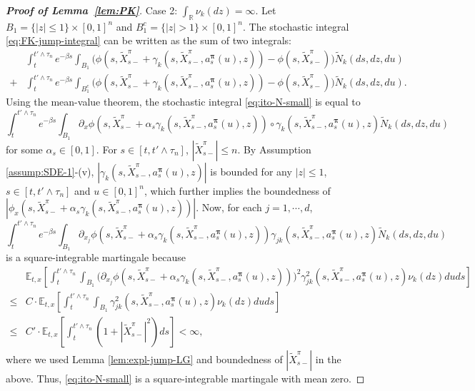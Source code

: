 \documentclass[11pt]{article}
\newcommand{\1}{\mathbbm{1}}
\newcommand{\bpi}{\boldsymbol{\pi}}
\begin{document}
\begin{proof}[\bf Proof of Lemma~\ref{lem:PK}]
	Case 2: $\int_{\mathbb{R}}\nu_k(dz)=\infty$. Let $B_{1}=\{|z|\leq 1\}\times[0,1]^n$ and $B_{1}^c=\{|z|> 1\}\times[0,1]^n$. The stochastic integral \eqref{eq:FK-jump-integral} can be written as the sum of two integrals:
	\begin{align}
	&\int_t^{t'\wedge\tau_n} e^{-\beta s}\int_{B_1} \big( \phi (s, \tilde X^{\pi}_{s-}+ \gamma_k(s, \tilde X^{\pi}_{s-}, a_s^{\bpi}(u), z)) -  \phi(s, \tilde X^{\pi}_{s-})  \big)  \widetilde{N}_k(ds, dz,du)\label{eq:ito-N-small}\\
	+&\int_t^{t'\wedge\tau_n} e^{-\beta s}\int_{B_1^c} \big( \phi(s, \tilde X^{\pi}_{s-}+ \gamma_k(s, \tilde X^{\pi}_{s-}, a_s^{\bpi}(u), z)) -  \phi(s, \tilde X^{\pi}_{s-})  \big)  \widetilde{N}_k(ds, dz, du).\label{eq:ito-N-big}
	\end{align}
	Using the mean-value theorem, the stochastic integral \eqref{eq:ito-N-small} is equal to
	\begin{equation}
		\int_t^{t'\wedge\tau_n} e^{-\beta s} \int_{B_1} \partial_x\phi(s, \tilde X^{\pi}_{s-}+\alpha_s\gamma_k(s, \tilde X^{\pi}_{s-}, a_s^{\bpi}(u),z))\circ\gamma_k(s, \tilde X^{\pi}_{s-}, a_s^{\bpi}(u),z)\widetilde{N}_k(ds, dz, du)
	\end{equation}
	for some $\alpha_s\in[0,1]$. For $s\in [t,t'\wedge\tau_n]$, $|\tilde X^{\pi}_{s-}|\leq n$. By Assumption \ref{assump:SDE-1}-(v),  $|\gamma_k(s, \tilde X^{\pi}_{s-} ,a_s^{\bpi}(u),z)|$ is bounded for any $|z|\leq 1$, $s\in [t,t'\wedge\tau_n]$ and $u\in[0,1]^n$, which further implies the boundedness of $|\phi_x(s, \tilde X^{\pi}_{s-}+\alpha_s\gamma_k(s, \tilde X^{\pi}_{s-}, a_s^{\bpi}(u), z))|$. Now, for each $j=1,\cdots,d$,
	\begin{equation}
		\int_t^{t'\wedge\tau_n} e^{-\beta s}\int_{B_1} \partial_{x_j}\phi(s, \tilde X^{\pi}_{s-}+\alpha_s\gamma_k(s, \tilde X^{\pi}_{s-}, a_s^{\bpi}(u), z))\gamma_{jk}(s, \tilde X^{\pi}_{s-}, a_s^{\bpi}(u), z)\widetilde{N}_k(ds, dz, du)
	\end{equation}
	is a square-integrable martingale because
	\begin{align}
		&\mathbb{E}_{t,x}\left[\int_t^{t'\wedge\tau_n}\int_{B_1} \big(\partial_{x_j}\phi(s, \tilde X^{\pi}_{s-}+\alpha_s\gamma_k(s, \tilde X^{\pi}_{s-} , a_s^{\bpi}(u), z))\big)^2\gamma_{jk}^2(s, \tilde X^{\pi}_{s-}, a_s^{\bpi}(u), z)\nu_k(dz)duds\right]\\
		\leq& C\cdot \mathbb{E}_{t,x}\left[\int_t^{t'\wedge\tau_n} \int_{B_1} \gamma_{jk}^2(s, \tilde X^{\pi}_{s-}, a_s^{\bpi}(u), z)\nu_k(dz)duds\right]\\
		\leq& C'\cdot\mathbb{E}_{t,x}\left[\int_t^{t'\wedge\tau_n} (1+|\tilde X^{\pi}_{s-}|^2)ds\right]<\infty,
	\end{align}
	where we used Lemma \ref{lem:expl-jump-LG} and boundedness of $|\tilde X^{\pi}_{s-}|$ in the above. Thus, \eqref{eq:ito-N-small} is a square-integrable martingale with mean zero.
	

\end{proof}
\end{document}
